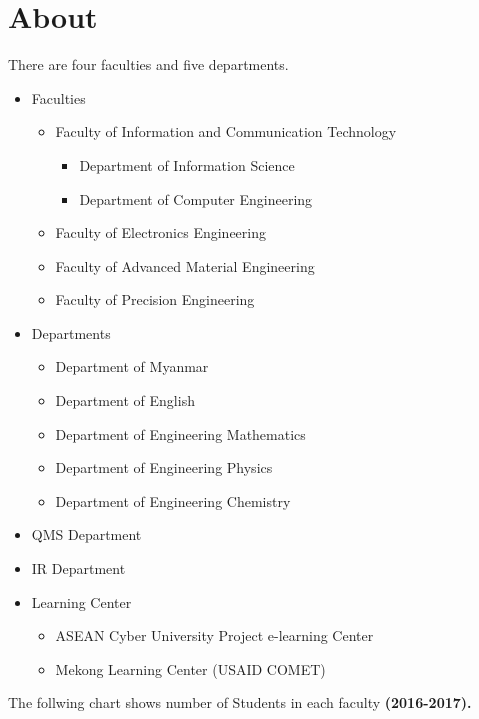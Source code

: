 \documentclass[conference]{IEEEtran}
\begin{document}
\section{About}
There are four faculties and five departments.
\begin{itemize}
\item Faculties
\begin{itemize}
\item Faculty of Information and Communication Technology
\begin{itemize}
\item Department of Information Science
\item Department of Computer Engineering
\end{itemize}
\item Faculty of Electronics Engineering
\item Faculty of Advanced Material Engineering
\item Faculty of Precision Engineering
\end{itemize}
\item Departments
\begin{itemize}
\item Department of Myanmar
\item Department of English
\item Department of Engineering Mathematics
\item Department of Engineering Physics
\item Department of Engineering Chemistry
\end{itemize}
\item QMS Department
\item IR Department
\item Learning Center
\begin{itemize}
\item ASEAN Cyber University Project e-learning Center
\item Mekong Learning Center (USAID COMET)
\end{itemize}
\end{itemize}
The follwing chart shows number of Students in each faculty \bf{(2016-2017)}.\\

\end{document}
